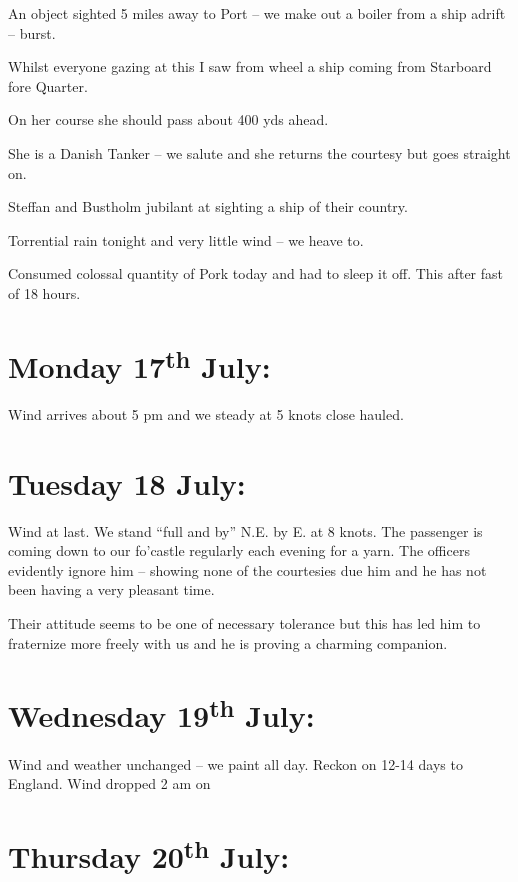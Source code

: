 \documentclass[
  11pt,
  msmallroyalvopaper
]{memoir}
\begin{document}
An object sighted 5 miles away to Port -- we make out a boiler from a
ship adrift -- burst.

Whilst everyone gazing at this I saw from wheel a ship coming from
Starboard fore Quarter.

On her course she should pass about 400 yds ahead.

She is a Danish Tanker -- we salute and she returns the courtesy but
goes straight on.

Steffan and Bustholm jubilant at sighting a ship of their country.

Torrential rain tonight and very little wind -- we heave to.

Consumed colossal quantity of Pork today and had to sleep it off. This
after fast of 18 hours.

\hypertarget{monday-17th-july}{%
\section{\texorpdfstring{Monday 17\textsuperscript{th}
July:}{Monday 17th July:}}\label{monday-17th-july}}

Wind arrives about 5 pm and we steady at 5 knots close hauled.

\hypertarget{tuesday-18-july}{%
\section{Tuesday 18 July:}\label{tuesday-18-july}}

Wind at last. We stand ``full and by'' N.E. by E. at 8 knots. The
passenger is coming down to our fo'castle regularly each evening for a
yarn. The officers evidently ignore him -- showing none of the
courtesies due him and he has not been having a very pleasant time.

Their attitude seems to be one of necessary tolerance but this has led
him to fraternize more freely with us and he is proving a charming
companion.

\hypertarget{wednesday-19th-july}{%
\section{\texorpdfstring{Wednesday 19\textsuperscript{th}
July:}{Wednesday 19th July:}}\label{wednesday-19th-july}}

Wind and weather unchanged -- we paint all day. Reckon on 12-14 days to
England. Wind dropped 2 am on

\hypertarget{thursday-20th-july}{%
\section{\texorpdfstring{Thursday 20\textsuperscript{th}
July:}{Thursday 20th July:}}\label{thursday-20th-july}}
\end{document}
